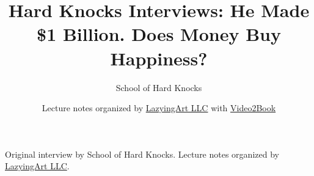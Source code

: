 \documentclass[11pt,oneside]{book}
\begin{document}
\frontmatter
\title{Hard Knocks Interviews: He Made \$1 Billion. Does Money Buy Happiness?}
\author{School of Hard Knocks}
\date{Lecture notes organized by \href{https://lazying.art}{LazyingArt LLC} with \href{https://github.com/lachlanchen/Video2Book}{Video2Book}}
\maketitle
\begin{center}
\small Original interview by School of Hard Knocks. Lecture notes organized by \href{https://lazying.art}{LazyingArt LLC}.
\end{center}
\clearpage
\mainmatter

\end{document}
